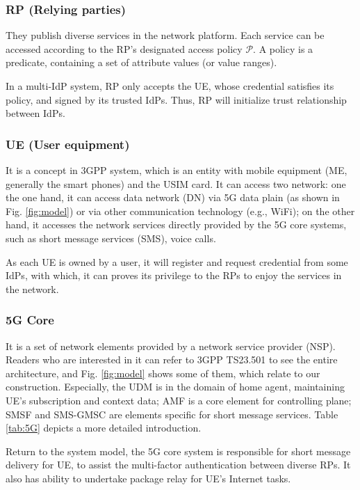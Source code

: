 \subsubsection{RP (Relying parties)}
They publish diverse services in the network platform. Each service can be accessed according to the RP's designated access policy $\mathcal{P}$. A policy is a predicate, containing a set of attribute values (or value ranges).

In a multi-IdP system, RP only accepts the UE, whose credential satisfies its policy, and signed by its trusted IdPs. Thus, RP will initialize trust relationship between IdPs.

\subsubsection{UE (User equipment)}
It is a concept in 3GPP system, which is an entity with mobile equipment (ME, generally the smart phones) and the USIM card. It can access two network: one the one hand, it can access data network (DN) via 5G data plain (as shown in Fig. \ref{fig:model}) or via other communication technology (e.g., WiFi); on the other hand, it accesses the network services directly provided by the 5G core systems, such as short message services (SMS), voice calls.

As each UE is owned by a user, it will register and request credential from some IdPs, with which, it can proves its privilege to the RPs to enjoy the services in the network. 

\subsubsection{5G Core}
It is a set of network elements provided by a network service provider (NSP). Readers who are interested in it can refer to 3GPP TS23.501 \cite{3gpp23501} to see the entire architecture, and Fig. \ref{fig:model} shows some of them, which relate to our construction. Especially, the UDM is in the domain of home agent, maintaining UE's subscription and context data; AMF is a core element for controlling plane; SMSF and SMS-GMSC are elements specific for short message services. Table \ref{tab:5G} depicts a more detailed introduction.

Return to the system model, the 5G core system is responsible for short message delivery for UE, to assist the multi-factor authentication between diverse RPs. It also has ability to undertake package relay for UE's Internet tasks.%

